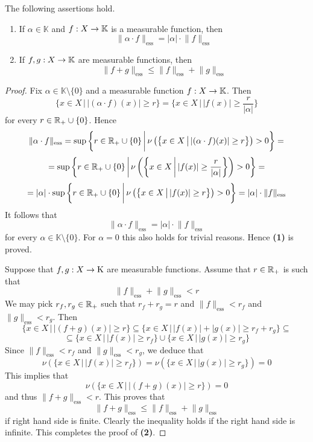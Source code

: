 \begin{proposition}\label{proposition:essential_supremum_is_a_seminorm}
    The following assertions hold.
    \begin{enumerate}[label=\emph{\textbf{(\arabic*)}}, leftmargin=*]
        \item If $\alpha \in \mathbb{K}$ and $f:X\rightarrow \mathbb{K}$ is a measurable function, then
              $$\lVert \alpha \cdot f\rVert_{\mathrm{ess}} = |\alpha|\cdot \lVert f\rVert_{\mathrm{ess}}$$
        \item If $f,g:X\rightarrow \mathbb{K}$ are measurable functions, then
              $$\lVert f + g \rVert_{\mathrm{ess}} \leq \lVert f \rVert_{\mathrm{ess}} + \lVert g \rVert_{\mathrm{ess}}$$
    \end{enumerate}
\end{proposition}
\begin{proof}
    Fix $\alpha \in \mathbb{K}\setminus \{0\}$ and a measurable function $f:X\rightarrow \mathbb{K}$. Then
    $$\{x\in X\,\big|\,| (\alpha \cdot f)(x)| \geq r \big\} = \bigg\{x\in X\,\bigg|\,|f(x)| \geq \frac{r}{|\alpha|}\bigg\}$$
    for every $r \in {\mathbb R}_+ \cup \{0\}$. Hence
    $$\lVert \alpha \cdot f\rVert_{\mathrm{ess}} = \sup \bigg\{r\in {\mathbb R}_+ \cup \{0\}\,\bigg|\,\nu\left(\big\{x\in X\,\big|\,|(\alpha \cdot f)(x)| \geq r \big\}\right) > 0\bigg\} =$$
    $$= \sup \bigg\{r \in {\mathbb R}_+\cup \{0\}\,\bigg|\,\nu\left(\bigg\{x\in X\,\bigg|\,|f(x)| \geq \frac{r}{|\alpha|}\bigg\}\right) > 0\bigg\} = $$
    $$= |\alpha| \cdot \sup \bigg\{r \in {\mathbb R}_+\cup \{0\}\,\bigg|\,\nu\left(\big\{x\in X\,\big|\,|f(x)| \geq r\big\}\right) > 0\bigg\} = |\alpha|\cdot \lVert f\rVert_{\mathrm{ess}}$$
    It follows that
    $$\lVert \alpha \cdot f\rVert_{\mathrm{ess}} = |\alpha|\cdot \lVert f\rVert_{\mathrm{ess}}$$
    for every $\alpha \in \mathbb{K}\setminus \{0\}$. For $\alpha = 0$ this also holds for trivial reasons. Hence \textbf{(1)} is proved.

    Suppose that $f,g:X\rightarrow \mathrm{K}$ are measurable functions. Assume that $r\in {\mathbb R}_+$ is such that
    $$\lVert f \rVert_{\mathrm{ess}} + \lVert g \rVert_{\mathrm{ess}} < r$$
    We may pick $r_f,r_g\in {\mathbb R}_+$ such that $r_f + r_g = r$ and $\lVert f \rVert_{\mathrm{ess}} < r_f$ and $\lVert g \rVert_{\mathrm{ess}} < r_g$. Then
    $$\{x\in X\,\big|\,|(f + g)(x)| \geq r \big\} \subseteq \big\{x\in X\,\big|\,|f(x)| + |g(x)| \geq r_f + r_g \big\} \subseteq $$
    $$\subseteq \big\{x\in X\,\big|\,|f(x)|  \geq r_f\big\} \cup \big\{x\in X\,\big|\,|g(x)|  \geq r_g\big\}$$
    Since $\lVert f \rVert_{\mathrm{ess}} < r_f$ and $\lVert g \rVert_{\mathrm{ess}} < r_g$, we deduce that
    $$\nu\left(\big\{x\in X\,\big|\,|f(x)|  \geq r_f\big\}\right) = \nu\left(\big\{x\in X\,\big|\,|g(x)|\geq r_g\big\}\right) = 0$$
    This implies that
    $$\nu\left(\{x\in X\,\big|\,|(f + g)(x)| \geq r\big\}\right) = 0$$
    and thus $\lVert f + g\rVert_{\mathrm{ess}} < r$. This proves that
    $$\lVert f + g \rVert_{\mathrm{ess}} \leq \lVert f \rVert_{\mathrm{ess}} + \lVert g \rVert_{\mathrm{ess}}$$
    if right hand side is finite. Clearly the inequality holds if the right hand side is infinite. This completes the proof of \textbf{(2)}.
\end{proof}

